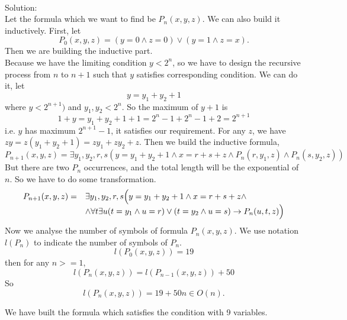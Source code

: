 \documentclass[a4papper]{article}
\theoremstyle{neosn}
\begin{document}

    \\

    Solution: \\

    Let the formula which we want to find be $P_n(x,y,z)$.
    We can also build it inductively.
    First, let
    \[
        P_0(x,y,z) = (y=0 \land z = 0) \lor (y=1 \land z=x).
    \]
    Then we are building the inductive part.\\
    Because we have the limiting condition $y < 2^n$, so we have to design the recursive
    process from $n$ to $n+1$ such that $y$ satisfies corresponding condition.
    We can do it, let
    \[
        y = y_1 + y_2 + 1
    \]
    where $y<2^{n+1})$ and $y_1, y_2 < 2^n$.
    So the maximum of $y+1$ is
    \[
        1+y = y_1 + y_2 + 1+1 = 2^n-1+2^n-1+2 = 2^{n+1}
    \]
    i.e. $y$ has maximum $2^{n+1} -1$, it satisfies our requirement.
    For any $z$, we have $zy = z(y_1+y_2+1) = zy_1+zy_2+z$.
    Then we build the inductive formula,
    \[
        P_{n+1}(x,y,z) = \exists y_1, y_2, r, s \left(y = y_1+y_2+1 \land x = r+s+z
        \land P_n(r,y_1,z) \land P_n(s,y_2,z)\right)
    \]
    But there are two $P_n$ occurrences, and the total length will be the exponential of $n$.
    So we have to do some transformation.
    \[
        \begin{array}{ll}

            P_{n+1}(x,y,z) = & \exists y_1, y_2, r, s \Big{(} y = y_1+y_2+1 \land x = r+s+z \land \\
            & \land \forall t \exists u (t=y_1 \land u = r) \lor (t=y_2 \land u=s) \to P_n(u,t,z) \Big{)}
        \end{array}
    \]
    Now we analyse the number of symbols of formula $P_n(x,y,z)$.
    We use notation $l(P_n)$ to indicate the number of symbols of $P_n$.
    \[
        l(P_0(x,y,z)) = 19
    \]
    then for any $n>=1$,
    \[
        l(P_n(x,y,z)) = l(P_{n-1}(x,y,z)) + 50
    \]
    So
    \[
        l(P_n(x,y,z)) = 19+50n \in O(n).
    \]

    We have built the formula which satisfies the condition with 9 variables.
    \\
\end{document}
